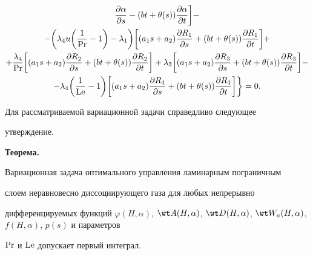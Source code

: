 \begin{multline*}
\frac{\partial\alpha}{\partial s}-(b t+\theta(s)) 


\frac{\partial\alpha}{\partial t}\bigg]- \\ 


% 


-\bigg(\lambda_4u\bigg(\frac{1}{\PR}-1\bigg)-\lambda_1\bigg) 


\bigg[(a_1s+a_2)\frac{\partial R_1}{\partial s}+ 


(b t +\theta(s))\frac{\partial R_1}{\partial t}\bigg]+ \\ 


% 


+\frac{\lambda_4}{\PR}\bigg[(a_1s+a_2) 


\frac{\partial R_2}{\partial s}+(b t+\theta(s)) 


\frac{\partial R_2}{\partial t}\bigg]+ 


\lambda_3\bigg[(a_1s+a_2)\frac{\partial R_3}{\partial s}+ 


(b t+\theta(s))\frac{\partial R_3}{\partial t}\bigg]- \\ 


% 


-\lambda_4\bigg(\frac{1}{\Le}-1\bigg)\bigg[ 


(a_1s+a_2)\frac{\partial R_4}{\partial s}+ 


(b t+\theta(s))\frac{\partial R_4}{\partial t}\bigg]\bigg\}=0. 


\end{multline*} 


 


Для рассматриваемой вариационной задачи справедливо следующее 


утверждение. 


\medskip 


 


{\bf Теорема.} {\it 


Вариационная задача оптимального управления ламинарным пограничным


слоем неравновесно диссоциирующего газа для любых непрерывно 


дифференцируемых функций $\varphi(H,\alpha)$, $\wt A(H,\alpha)$, $\wt 


D(H,\alpha)$, $\wt W_a(H,\alpha)$, $f(H,\alpha)$, $p(s)$ и параметров 


$\operatorname{Pr}$ и $\operatorname{Le}$ допускает первый интеграл. 


} 


\medskip 



